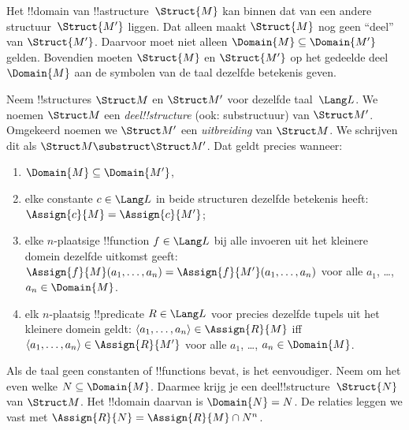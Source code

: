 \documentclass[../../../include/open-logic-section]{subfiles}
\begin{document}

Het !!{domain} van !!a{structure}~$\Struct{M}$ kan binnen dat van een
andere structuur~$\Struct{M'}$ liggen.  Dat alleen maakt $\Struct{M}$
nog geen ``deel'' van $\Struct{M'}$.  Daarvoor moet niet alleen
$\Domain{M} \subseteq \Domain{M'}$ gelden.  Bovendien moeten
$\Struct{M}$ en $\Struct{M'}$ op het gedeelde deel~$\Domain{M}$ aan
de symbolen van de taal dezelfde betekenis geven.

\begin{defn}
Neem !!{structure}s $\Struct M$ en $\Struct M'$ voor dezelfde
taal~$\Lang L$.  We noemen $\Struct M$ een \emph{deel!!{structure}}
(ook: substructuur) van $\Struct M'$.  Omgekeerd noemen we $\Struct M'$
een \emph{uitbreiding} van $\Struct M$.  We schrijven dit als
$\Struct M \substruct \Struct M'$.  Dat geldt precies wanneer:
\begin{enumerate}
\item $\Domain{M} \subseteq \Domain{M'}$,
\item elke constante $c \in \Lang L$ in beide structuren dezelfde
  betekenis heeft: $\Assign{c}{M} =
    \Assign{c}{M'}$;
\item elke $n$-plaatsige !!{function} $f \in \Lang L$ bij alle
  invoeren uit het kleinere domein dezelfde uitkomst geeft:
  $\Assign{f}{M}(a_1, \dots, a_n) = \Assign{f}{M'}(a_1, \dots, a_n)$
  voor alle $a_1$, \dots, $a_n \in \Domain{M}$.
\item elk $n$-plaatsig !!{predicate} $R \in \Lang L$ voor precies
  dezelfde tupels uit het kleinere domein geldt: $\langle
  a_1, \dots, a_n\rangle \in \Assign{R}{M}$ iff $\langle a_1, \dots,
  a_n\rangle \in \Assign{R}{M'}$ voor alle $a_1$, \dots, $a_n \in
  \Domain{M}$.
\end{enumerate}
\end{defn}

\begin{rem}
Als de taal geen constanten of !!{function}s bevat, is het eenvoudiger.
Neem om het even welke $N \subseteq \Domain{M}$.  Daarmee krijg je een
deel!!{structure}~$\Struct{N}$ van $\Struct M$.  Het !!{domain} daarvan
is $\Domain{N} = N$.  De relaties leggen we vast met $\Assign{R}{N} =
\Assign{R}{M} \cap N^n$.
\end{rem}

\end{document}
